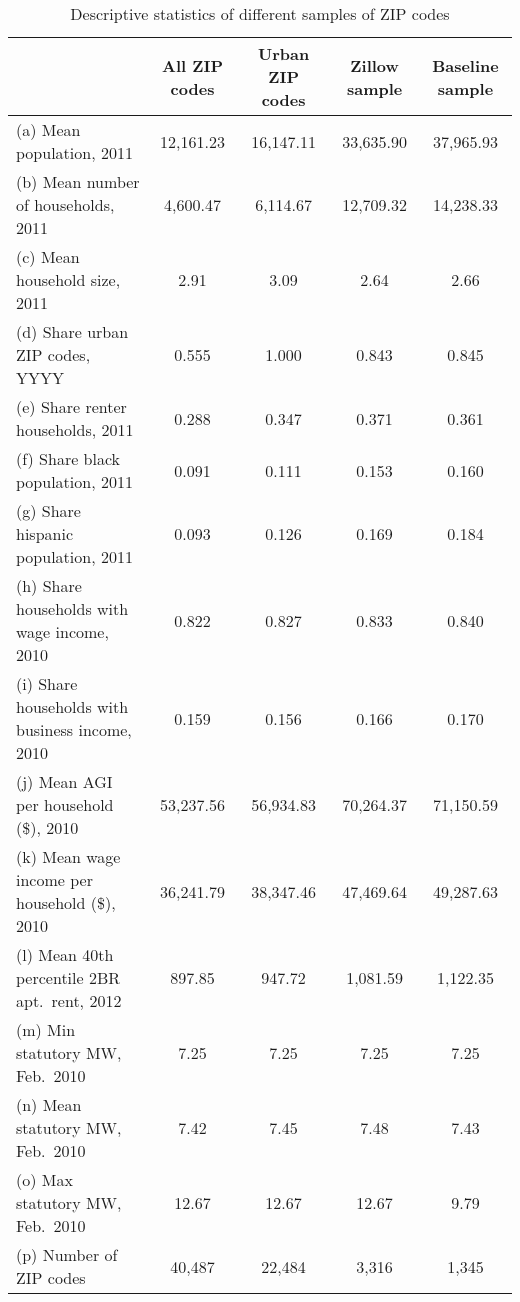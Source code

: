 \begin{table}[hbt!] \centering
    \caption{Descriptive statistics of different samples of ZIP codes}
    \label{tab:stats_zip_samples}
    \begin{tabular}{@{}lcccc@{}}
        \toprule
                                                        & \multicolumn{1}{c}{All ZIP codes} 
                                                        & \multicolumn{1}{c}{Urban ZIP codes} 
                                                        & \multicolumn{1}{c}{Zillow sample} 
                                                        & \multicolumn{1}{c}{Baseline sample}      \\ \midrule
        (a) Mean population, 2011                       & 12,161.23 & 16,147.11  & 33,635.90  & 37,965.93    \\
        (b) Mean number of households, 2011             & 4,600.47  & 6,114.67  & 12,709.32  & 14,238.33      \\
        (c) Mean household size, 2011                   & 2.91    & 3.09  & 2.64  & 2.66         \\
        (d) Share urban ZIP codes, YYYY                 & 0.555    & 1.000   & 0.843   & 0.845          \\
        (e) Share renter households, 2011               & 0.288    & 0.347   & 0.371   & 0.361          \\
        (f) Share black population, 2011                & 0.091    & 0.111   & 0.153   & 0.160          \\
        (g) Share hispanic population, 2011             & 0.093    & 0.126   & 0.169   & 0.184          \\
        (h) Share households with wage income, 2010     & 0.822    & 0.827   & 0.833   & 0.840          \\
        (i) Share households with business income, 2010 & 0.159    & 0.156   & 0.166   & 0.170          \\
        (j) Mean AGI per household (\$), 2010           & 53,237.56  & 56,934.83  & 70,264.37  & 71,150.59         \\
        (k) Mean wage income per household (\$), 2010   & 36,241.79   & 38,347.46  & 47,469.64  & 49,287.63         \\
        (l) Mean 40th percentile 2BR apt.\ rent, 2012   & 897.85   & 947.72  & 1,081.59  & 1,122.35         \\
        (m) Min statutory MW, Feb.\ 2010                & 7.25    & 7.25  & 7.25  & 7.25         \\
        (n) Mean statutory MW, Feb.\ 2010               & 7.42    & 7.45  & 7.48  & 7.43         \\
        (o) Max statutory MW, Feb.\ 2010                & 12.67   & 12.67   & 12.67  & 9.79         \\
        (p) Number of ZIP codes                         & 40,487  & 22,484  & 3,316  & 1,345      \\ \bottomrule
    \end{tabular}


\end{table}
